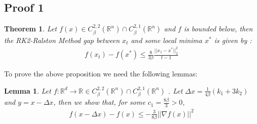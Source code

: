 \documentclass[12pt,twoside]{article}
\newtheorem{lemma}{Lemma}
\newtheorem{thm}{Theorem}
\begin{document}
\subsection{Proof 1}
\begin{thm} Let $f(x) \in C_{\beta}^{2,2}( \mathbb{R}^n) \cap  C_{\beta}^{2,1}( \mathbb{R}^n)$ and $f$ is bounded below, then the RK2-Ralston Method gap between $x_t$ and some local minima $x^*$ is given by :
\begin{align*}
f(x_t) - f(x^*) \leq \frac{8}{3 \beta} \frac{ || x_1 - x^* ||_2^2}{t-1}
\end{align*}
\end{thm}

To prove the above proposition we need the following lemmas:
\begin{lemma}
Let $f : \mathbb{R}^d \rightarrow \mathbb{R} \in C_{\beta}^{2,2}( \mathbb{R}^n) \cap  C_{\beta}^{2,1}( \mathbb{R}^n) $  . Let $\Delta x =  \frac{1}{4\beta}(k_1 + 3k_2)$ and $ y  = x - \Delta x$, then  we show that, for some $c_1= \frac{8\beta}{3} >0 $,
\begin{align}
f(x - \Delta x ) - f(x) \leq - \frac{3}{8 \beta} || \nabla f(x) ||^2 \\
\end{align}
\end{lemma}
\end{document}

